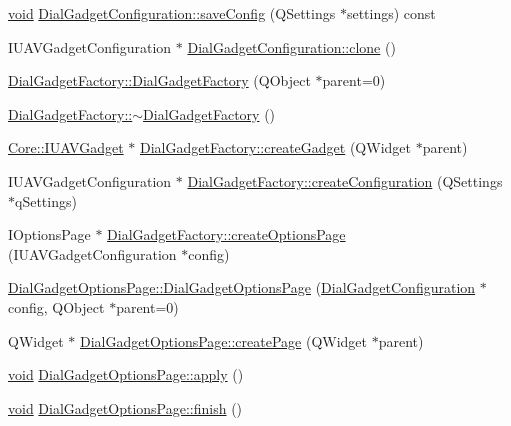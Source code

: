 \begin{DoxyCompactItemize}
\item 
\hyperlink{group___u_a_v_objects_plugin_ga444cf2ff3f0ecbe028adce838d373f5c}{void} \hyperlink{group___dial_plugin_ga77e000666d924bfc77a05a04b30d00f8}{\-Dial\-Gadget\-Configuration\-::save\-Config} (\-Q\-Settings $\ast$settings) const 
\item 
\-I\-U\-A\-V\-Gadget\-Configuration $\ast$ \hyperlink{group___dial_plugin_ga4cb0aa67ea10afa557dbf083d67f2510}{\-Dial\-Gadget\-Configuration\-::clone} ()
\item 
\hyperlink{group___dial_plugin_ga96aa76f96e82147d1054198b8e5baccc}{\-Dial\-Gadget\-Factory\-::\-Dial\-Gadget\-Factory} (\-Q\-Object $\ast$parent=0)
\item 
\hyperlink{group___dial_plugin_gaa1a6c5c829367397107f9bf058d3838f}{\-Dial\-Gadget\-Factory\-::$\sim$\-Dial\-Gadget\-Factory} ()
\item 
\hyperlink{class_core_1_1_i_u_a_v_gadget}{\-Core\-::\-I\-U\-A\-V\-Gadget} $\ast$ \hyperlink{group___dial_plugin_gaa66ae505f320ed3092d13c52533951fb}{\-Dial\-Gadget\-Factory\-::create\-Gadget} (\-Q\-Widget $\ast$parent)
\item 
\-I\-U\-A\-V\-Gadget\-Configuration $\ast$ \hyperlink{group___dial_plugin_ga19fedc047658860b63df440fcd9d58c0}{\-Dial\-Gadget\-Factory\-::create\-Configuration} (\-Q\-Settings $\ast$q\-Settings)
\item 
\-I\-Options\-Page $\ast$ \hyperlink{group___dial_plugin_gabea23502f0a1a7c8b37131c0a24faeb8}{\-Dial\-Gadget\-Factory\-::create\-Options\-Page} (\-I\-U\-A\-V\-Gadget\-Configuration $\ast$config)
\item 
\hyperlink{group___dial_plugin_gaeac54ffbddafca4f7d4b61d9d8af758a}{\-Dial\-Gadget\-Options\-Page\-::\-Dial\-Gadget\-Options\-Page} (\hyperlink{class_dial_gadget_configuration}{\-Dial\-Gadget\-Configuration} $\ast$config, \-Q\-Object $\ast$parent=0)
\item 
\-Q\-Widget $\ast$ \hyperlink{group___dial_plugin_gac2ea2636090b7981bddc06307c640fbb}{\-Dial\-Gadget\-Options\-Page\-::create\-Page} (\-Q\-Widget $\ast$parent)
\item 
\hyperlink{group___u_a_v_objects_plugin_ga444cf2ff3f0ecbe028adce838d373f5c}{void} \hyperlink{group___dial_plugin_gaacfb7eb82dfc96795090f651e40bd640}{\-Dial\-Gadget\-Options\-Page\-::apply} ()
\item 
\hyperlink{group___u_a_v_objects_plugin_ga444cf2ff3f0ecbe028adce838d373f5c}{void} \hyperlink{group___dial_plugin_gacc0c745076376c99081b3c52d916e209}{\-Dial\-Gadget\-Options\-Page\-::finish} ()
\item 

\end{DoxyCompactItemize}
